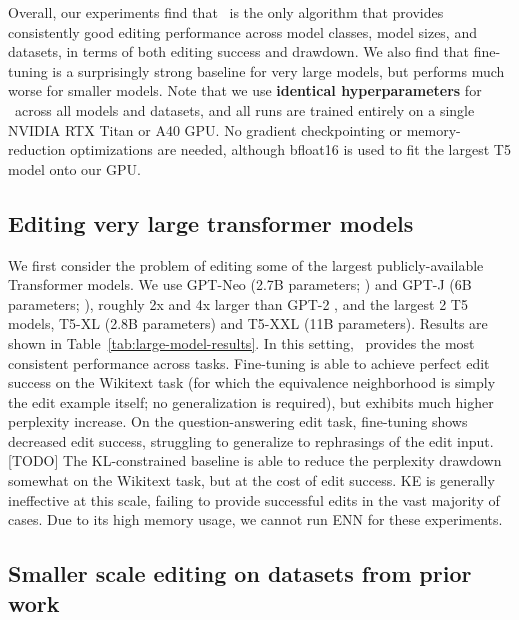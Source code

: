 \documentclass{article}
\begin{document}
Overall, our experiments find that \name~is the only algorithm that provides consistently good editing performance across model classes, model sizes, and datasets, in terms of both editing success and drawdown. We also find that fine-tuning is a surprisingly strong baseline for very large models, but performs much worse for smaller models. Note that we use \textbf{identical hyperparameters} for \name~across all models and datasets, and all runs are trained entirely on a single NVIDIA RTX Titan or A40 GPU.
No gradient checkpointing or memory-reduction optimizations are needed, although bfloat16 is used to fit the largest T5 model onto our GPU.

\subsection{Editing very large transformer models}
\label{sec:large-models}
We first consider the problem of editing some of the largest publicly-available Transformer models. We use GPT-Neo (2.7B parameters; \citealp{gpt-neo}) and GPT-J (6B parameters; \citealp{gpt-j}), roughly 2x and 4x larger than GPT-2 \citep{radford2019language}, and the largest 2 T5 models, T5-XL (2.8B parameters) and T5-XXL (11B parameters). Results are shown in Table~\ref{tab:large-model-results}. In this setting, \name~provides the most consistent performance across tasks. Fine-tuning is able to achieve perfect edit success on the Wikitext task (for which the equivalence neighborhood is simply the edit example itself; no generalization is required), but exhibits much higher perplexity increase. On the question-answering edit task, fine-tuning shows decreased edit success, struggling to generalize to rephrasings of the edit input. [TODO] The KL-constrained baseline is able to reduce the perplexity drawdown somewhat on the Wikitext task, but at the cost of edit success. KE is generally ineffective at this scale, failing to provide successful edits in the vast majority of cases. Due to its high memory usage, we cannot run ENN for these experiments.

\subsection{Smaller scale editing on datasets from prior work}
\label{sec:small-scale}
\end{document}

